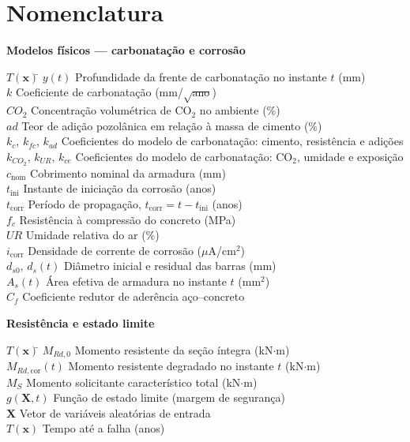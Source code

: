 \section*{Nomenclatura}


\noindent\textbf{Modelos físicos --- carbonatação e corrosão}
\begin{tabbing}
$T(\mathbf{x})$\qquad\qquad \= \kill
$y(t)$        \> Profundidade da frente de carbonatação no instante $t$ (mm) \\
$k$           \> Coeficiente de carbonatação (mm/$\sqrt{\text{ano}}$) \\
$CO_2$        \> Concentração volumétrica de CO$_2$ no ambiente (\%) \\
$ad$          \> Teor de adição pozolânica em relação à massa de cimento (\%) \\
$k_c,\,k_{fc},\,k_{ad}$ \> Coeficientes do modelo de carbonatação: cimento, resistência e adições \\
$k_{CO_2},\,k_{UR},\,k_{ce}$ \> Coeficientes do modelo de carbonatação: CO$_2$, umidade e exposição \\
$c_{\mathrm{nom}}$ \> Cobrimento nominal da armadura (mm) \\
$t_{\mathrm{ini}}$ \> Instante de inicia\c{c}\~ao da corrosão (anos) \\
$t_{\mathrm{corr}}$ \> Per\'iodo de propaga\c{c}\~ao, $t_{\mathrm{corr}} = t - t_{\mathrm{ini}}$ (anos) \\
$f_c$         \> Resist\^encia \`a compress\~ao do concreto (MPa) \\
$UR$          \> Umidade relativa do ar (\%) \\
$i_{\mathrm{corr}}$ \> Densidade de corrente de corrosão ($\mu$A/cm$^2$) \\
$d_{s0},\,d_s(t)$ \> Di\^ametro inicial e residual das barras (mm) \\
$A_s(t)$      \> \'Area efetiva de armadura no instante $t$ (mm$^2$) \\
$C_f$         \> Coeficiente redutor de ader\^encia a\c{c}o--concreto
\end{tabbing}

 \noindent\textbf{Resistência e estado limite}
\begin{tabbing}
$T(\mathbf{x})$\qquad\qquad \= \kill
$M_{Rd,0}$              \> Momento resistente da seção íntegra (kN$\cdot$m) \\
$M_{Rd,\mathrm{cor}}(t)$ \> Momento resistente degradado no instante $t$ (kN$\cdot$m) \\
$M_S$                   \> Momento solicitante característico total (kN$\cdot$m) \\
$g(\mathbf{X},t)$       \> Função de estado limite (margem de segurança) \\
$\mathbf{X}$            \> Vetor de variáveis aleatórias de entrada \\
$T(\mathbf{x})$         \> Tempo até a falha (anos)
\end{tabbing}

